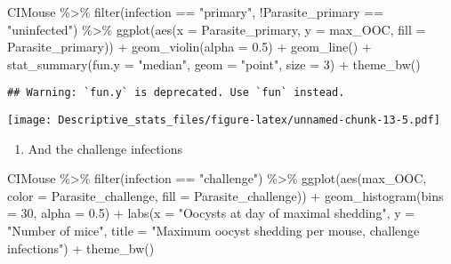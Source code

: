 \documentclass[
]{article}
\newenvironment{Shaded}{\begin{snugshade}}{\end{snugshade}}
\newcommand{\AttributeTok}[1]{\textcolor[rgb]{0.77,0.63,0.00}{#1}}
\newcommand{\DecValTok}[1]{\textcolor[rgb]{0.00,0.00,0.81}{#1}}
\newcommand{\FloatTok}[1]{\textcolor[rgb]{0.00,0.00,0.81}{#1}}
\newcommand{\FunctionTok}[1]{\textcolor[rgb]{0.00,0.00,0.00}{#1}}
\newcommand{\NormalTok}[1]{#1}
\newcommand{\SpecialCharTok}[1]{\textcolor[rgb]{0.00,0.00,0.00}{#1}}
\newcommand{\StringTok}[1]{\textcolor[rgb]{0.31,0.60,0.02}{#1}}
\providecommand{\tightlist}{%
  \setlength{\itemsep}{0pt}\setlength{\parskip}{0pt}}
\begin{document}
\begin{Shaded}
\begin{Highlighting}[]
\NormalTok{CIMouse  }\SpecialCharTok{\%\textgreater{}\%}
    \FunctionTok{filter}\NormalTok{(infection }\SpecialCharTok{==} \StringTok{"primary"}\NormalTok{, }\SpecialCharTok{!}\NormalTok{Parasite\_primary }\SpecialCharTok{==} \StringTok{"uninfected"}\NormalTok{)  }\SpecialCharTok{\%\textgreater{}\%}
  \FunctionTok{ggplot}\NormalTok{(}\FunctionTok{aes}\NormalTok{(}\AttributeTok{x =}\NormalTok{ Parasite\_primary, }\AttributeTok{y =}\NormalTok{ max\_OOC, }\AttributeTok{fill =}\NormalTok{ Parasite\_primary)) }\SpecialCharTok{+}
  \FunctionTok{geom\_violin}\NormalTok{(}\AttributeTok{alpha =} \FloatTok{0.5}\NormalTok{) }\SpecialCharTok{+}
    \FunctionTok{geom\_line}\NormalTok{() }\SpecialCharTok{+}
     \FunctionTok{stat\_summary}\NormalTok{(}\AttributeTok{fun.y =} \StringTok{"median"}\NormalTok{, }\AttributeTok{geom =} \StringTok{"point"}\NormalTok{, }\AttributeTok{size =} \DecValTok{3}\NormalTok{) }\SpecialCharTok{+}
    \FunctionTok{theme\_bw}\NormalTok{() }
\end{Highlighting}
\end{Shaded}

\begin{verbatim}
## Warning: `fun.y` is deprecated. Use `fun` instead.
\end{verbatim}

\texttt{[image: Descriptive\_stats\_files/figure-latex/unnamed-chunk-13-5.pdf]}

\begin{enumerate}
\def\labelenumi{\arabic{enumi}.}
\setcounter{enumi}{1}
\tightlist
\item
  And the challenge infections
\end{enumerate}

\begin{Shaded}
\begin{Highlighting}[]
\NormalTok{CIMouse }\SpecialCharTok{\%\textgreater{}\%}
    \FunctionTok{filter}\NormalTok{(infection }\SpecialCharTok{==} \StringTok{"challenge"}\NormalTok{)  }\SpecialCharTok{\%\textgreater{}\%}
  \FunctionTok{ggplot}\NormalTok{(}\FunctionTok{aes}\NormalTok{(max\_OOC, }\AttributeTok{color =}\NormalTok{ Parasite\_challenge, }\AttributeTok{fill =}\NormalTok{ Parasite\_challenge)) }\SpecialCharTok{+}
  \FunctionTok{geom\_histogram}\NormalTok{(}\AttributeTok{bins =} \DecValTok{30}\NormalTok{, }\AttributeTok{alpha =} \FloatTok{0.5}\NormalTok{) }\SpecialCharTok{+}
  \FunctionTok{labs}\NormalTok{(}\AttributeTok{x =} \StringTok{"Oocysts at day of maximal shedding"}\NormalTok{, }\AttributeTok{y =} \StringTok{"Number of mice"}\NormalTok{,}
       \AttributeTok{title =} \StringTok{"Maximum oocyst shedding per mouse, challenge infections"}\NormalTok{) }\SpecialCharTok{+}
    \FunctionTok{theme\_bw}\NormalTok{()}
\end{Highlighting}
\end{Shaded}
\end{document}
